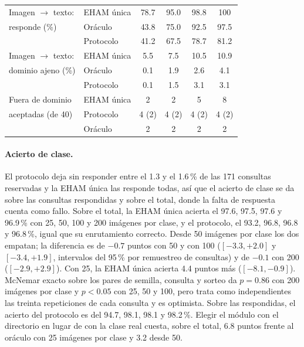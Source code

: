 \begin{table}[H]
\begin{tabular}{llcccc}
        Imagen $\to$ texto:        & EHAM única & 78.7 & 95.0 & 98.8 & 100  \\
        responde (\%)              & Oráculo    & 43.8 & 75.0 & 92.5 & 97.5 \\
                                   & Protocolo  & 41.2 & 67.5 & 78.7 & 81.2 \\
        \midrule
        Imagen $\to$ texto:        & EHAM única & 5.5  & 7.5  & 10.5 & 10.9 \\
        dominio ajeno (\%)         & Oráculo    & 0.1  & 1.9  & 2.6  & 4.1  \\
                                   & Protocolo  & 0.1  & 1.5  & 3.1  & 3.1  \\
        \midrule
        Fuera de dominio           & EHAM única & 2     & 2     & 5     & 8     \\
        aceptadas (de 40)          & Protocolo  & 4 (2) & 4 (2) & 4 (2) & 4 (2) \\
                                   & Oráculo    & 2     & 2     & 2     & 2     \\
        \bottomrule
    \end{tabular}
\end{table}

\paragraph{Acierto de clase.}
El protocolo deja sin responder entre el 1.3 y el 1.6\,\% de las 171 consultas
reservadas y la EHAM única las responde todas, así que el acierto de clase se da sobre
las consultas respondidas y sobre el total, donde la falta de respuesta cuenta como
fallo.
Sobre el total, la EHAM única acierta el 97.6, 97.5, 97.6 y 96.9\,\% con 25, 50, 100 y
200 imágenes por clase, y el protocolo, el 93.2, 96.8, 96.8 y 96.8\,\%, igual que su
enrutamiento correcto.
Desde 50 imágenes por clase los dos empatan; la diferencia es de $-0.7$ puntos con 50 y
con 100 ($[-3.3, +2.0]$ y $[-3.4, +1.9]$, intervalos del 95\,\% por remuestreo de
consultas) y de $-0.1$ con 200 ($[-2.9, +2.9]$).
Con 25, la EHAM única acierta 4.4 puntos más ($[-8.1, -0.9]$).
McNemar exacto sobre los pares de semilla, consulta y sorteo da $p = 0.86$ con 200
imágenes por clase y $p < 0.05$ con 25, 50 y 100, pero trata como independientes las
treinta repeticiones de cada consulta y es optimista.
Sobre las respondidas, el acierto del protocolo es del 94.7, 98.1, 98.1 y 98.2\,\%.
Elegir el módulo con el directorio en lugar de con la clase real cuesta, sobre el
total, 6.8 puntos frente al oráculo con 25 imágenes por clase y 3.2 desde 50.

